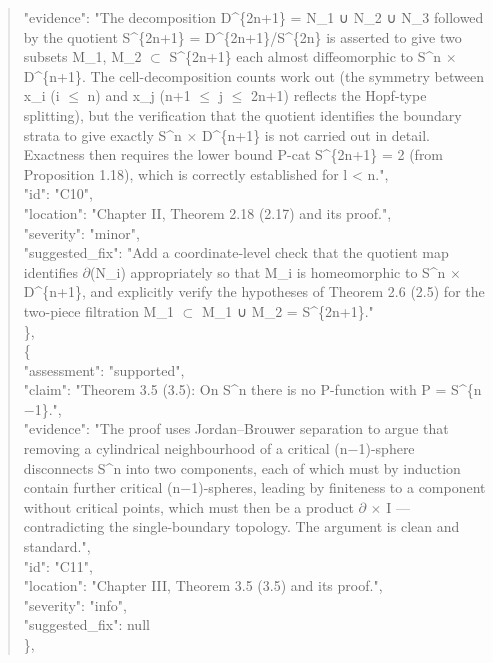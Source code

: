 \documentclass[11pt]{article}
\begin{document}
\begin{quote}
      "evidence": "The decomposition D\^{}\{2n+1\} = N\_1 ∪ N\_2 ∪ N\_3 followed by the quotient S\^{}\{2n+1\} = D\^{}\{2n+1\}/S\^{}\{2n\} is asserted to give two subsets M\_1, M\_2 \ensuremath{\subset} S\^{}\{2n+1\} each almost diffeomorphic to S\^{}n \ensuremath{\times} D\^{}\{n+1\}. The cell-decomposition counts work out (the symmetry between x\_i (i \ensuremath{\le} n) and x\_j (n+1 \ensuremath{\le} j \ensuremath{\le} 2n+1) reflects the Hopf-type splitting), but the verification that the quotient identifies the boundary strata to give exactly S\^{}n \ensuremath{\times} D\^{}\{n+1\} is not carried out in detail. Exactness then requires the lower bound P-cat S\^{}\{2n+1\} = 2 (from Proposition 1.18), which is correctly established for l < n.",\\
      "id": "C10",\\
      "location": "Chapter II, Theorem 2.18 (2.17) and its proof.",\\
      "severity": "minor",\\
      "suggested\_fix": "Add a coordinate-level check that the quotient map identifies \ensuremath{\partial}(N\_i) appropriately so that M\_i is homeomorphic to S\^{}n \ensuremath{\times} D\^{}\{n+1\}, and explicitly verify the hypotheses of Theorem 2.6 (2.5) for the two-piece filtration M\_1 \ensuremath{\subset} M\_1 ∪ M\_2 = S\^{}\{2n+1\}."\\
    \},\\
    \{\\
      "assessment": "supported",\\
      "claim": "Theorem 3.5 (3.5): On S\^{}n there is no P-function with P = S\^{}\{n\ensuremath{-}1\}.",\\
      "evidence": "The proof uses Jordan--Brouwer separation to argue that removing a cylindrical neighbourhood of a critical (n\ensuremath{-}1)-sphere disconnects S\^{}n into two components, each of which must by induction contain further critical (n\ensuremath{-}1)-spheres, leading by finiteness to a component without critical points, which must then be a product \ensuremath{\partial} \ensuremath{\times} I --- contradicting the single-boundary topology. The argument is clean and standard.",\\
      "id": "C11",\\
      "location": "Chapter III, Theorem 3.5 (3.5) and its proof.",\\
      "severity": "info",\\
      "suggested\_fix": null\\
    \},\\

\end{quote}
\end{document}
